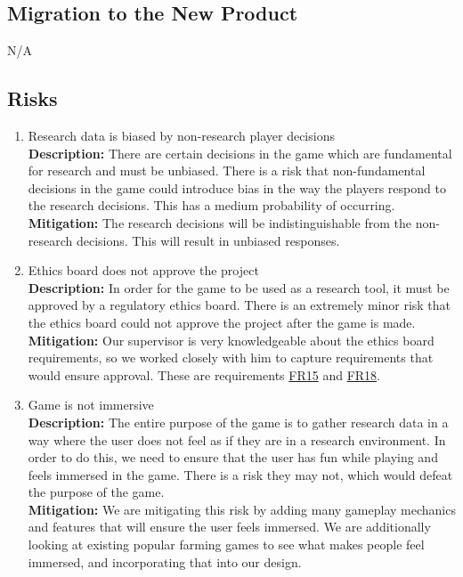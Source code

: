 \documentclass{article}
\begin{document}
\subsection{Migration to the New Product}
N/A

\subsection{Risks}
\begin{enumerate}[{R}1.]
    \item Research data is biased by non-research player decisions 
    \\ \textbf{Description:} There are certain decisions in the game which are fundamental for research and must be unbiased. There is a risk that non-fundamental decisions in the game could introduce bias in the way the players respond to the research decisions. This has a medium probability of occurring.
    \\ \textbf{Mitigation:} The research decisions will be indistinguishable from the non-research decisions. This will result in unbiased responses. 
    
    \item Ethics board does not approve the project
    \\ \textbf{Description:} In order for the game to be used as a research tool, it must be approved by a regulatory ethics board. There is an extremely minor risk that the ethics board could not approve the project after the game is made.
    \\ \textbf{Mitigation:} Our supervisor is very knowledgeable about the ethics board requirements, so we worked closely with him to capture requirements that would ensure approval. These are requirements \hyperref[FR15]{FR15} and \hyperref[FR18]{FR18}.
    
    \item Game is not immersive
    \\ \textbf{Description:} The entire purpose of the game is to gather research data in a way where the user does not feel as if they are in a research environment. In order to do this, we need to ensure that the user has fun while playing and feels immersed in the game. There is a risk they may not, which would defeat the purpose of the game.
    \\ \textbf{Mitigation:} We are mitigating this risk by adding many gameplay mechanics and features that will ensure the user feels immersed. We are additionally looking at existing popular farming games to see what makes people feel immersed, and incorporating that into our design.
    

\end{enumerate}
\end{document}
